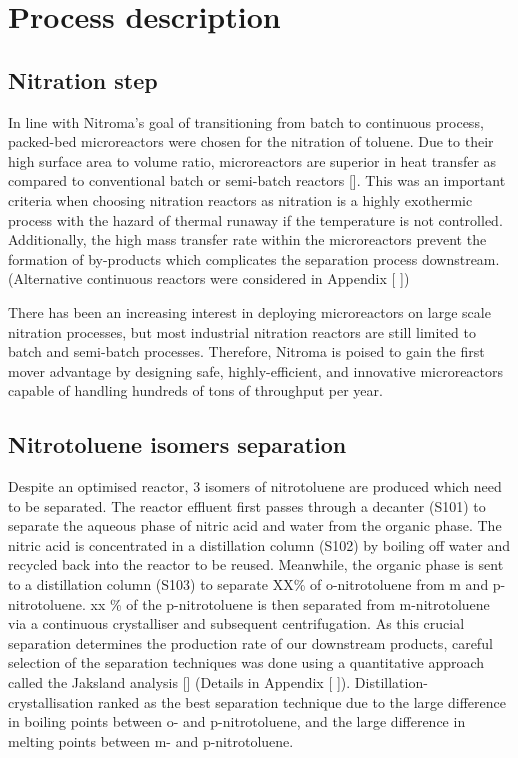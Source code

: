 \section{Process description}
\label{sec:process}
\subsection{Nitration step}
In line with Nitroma's goal of transitioning from batch to continuous process, packed-bed microreactors were chosen for the nitration of toluene. Due to their high surface area to volume ratio, microreactors are superior in heat transfer as compared to conventional batch or semi-batch reactors []. This was an important criteria when choosing nitration reactors as nitration is a highly exothermic process with the hazard of thermal runaway if the temperature is not controlled. Additionally, the high mass transfer rate within the microreactors prevent the formation of by-products which complicates the separation process downstream.
(Alternative continuous reactors were considered in Appendix [ ])

There has been an increasing interest in deploying microreactors on large scale nitration processes, but most industrial nitration reactors are still limited to batch and semi-batch processes. Therefore, Nitroma is poised to gain the first mover advantage by designing safe, highly-efficient, and innovative microreactors capable of handling hundreds of tons of throughput per year.

\subsection{Nitrotoluene isomers separation}
Despite an optimised reactor, 3 isomers of nitrotoluene are produced which need to be separated. The reactor effluent first passes through a decanter (S101) to separate the aqueous phase of nitric acid and water from the organic phase. The nitric acid is concentrated in a distillation column (S102) by boiling off water and recycled back into the reactor to be reused. Meanwhile, the organic phase is sent to a distillation column (S103) to separate XX\% of o-nitrotoluene from m and p-nitrotoluene. xx \% of the p-nitrotoluene is then separated from m-nitrotoluene via a continuous crystalliser and subsequent centrifugation. As this crucial separation determines the production rate of our downstream products, careful selection of the separation techniques was done using a quantitative approach called the Jaksland analysis [] (Details in Appendix [ ]). Distillation-crystallisation ranked as the best separation technique due to the large difference in boiling points between o- and p-nitrotoluene, and the large difference in melting points between m- and p-nitrotoluene.

